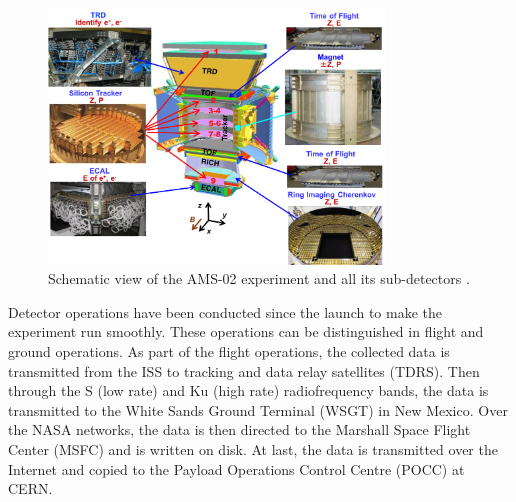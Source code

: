 \begin{figure}[]
\centering
\includegraphics[width=0.8\textwidth, height=0.4\textheight ]{Figures/chapter3/Overview/AMS02Geometry.png}
\caption[Schematic view of the AMS-02 experiment.]{Schematic view of the AMS-02 experiment and all its sub-detectors \cite{AMSWebside}. }
\label{AMS02Geometry}
\end{figure}

Detector operations have been conducted since the launch to make the experiment run smoothly. These operations can be distinguished in flight and ground operations. As part of the flight operations, the collected data is transmitted from the ISS to tracking and data relay satellites (TDRS). Then through the S (low rate) and Ku (high rate) radiofrequency bands, the data is transmitted to the White Sands Ground Terminal (WSGT) in New Mexico. Over the NASA networks, the data is then directed to the Marshall Space Flight Center (MSFC) and is written on disk. At last, the data is transmitted over the Internet and copied to the Payload Operations Control Centre (POCC) at CERN.







